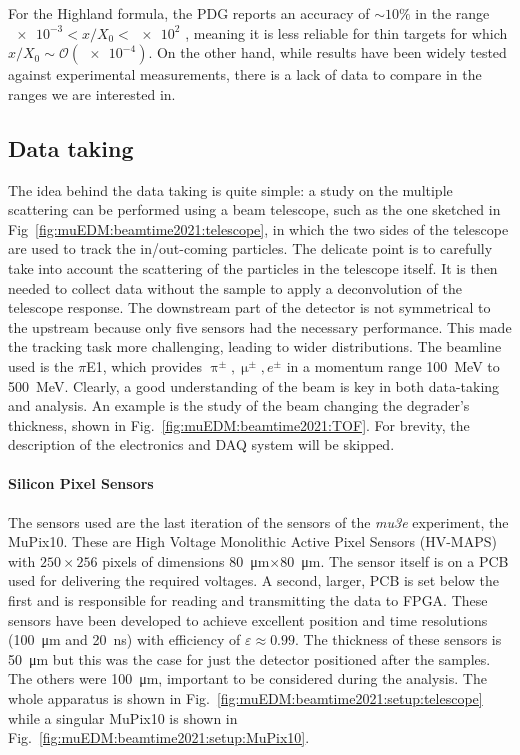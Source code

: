 \begin{refsection}
        \noindent
        For the Highland formula, the PDG reports an accuracy of $\sim 10\%$ in the range $\num{e-3}<x/X_0<\num{e2}$ \cite{PDG}, meaning it is less reliable for thin targets for which $x/X_0 \sim \mathcal{O}(\num{e-4})$.
        On the other hand, while \gf results have been widely tested against experimental measurements, there is a lack of data to compare in the ranges we are interested in.

    \subsection{Data taking}
        The idea behind the data taking is quite simple: a study on the multiple scattering can be performed using a beam telescope, such as the one sketched in Fig~\ref{fig:muEDM:beamtime2021:telescope}, in which the two sides of the telescope are used to track the in/out-coming particles. 
        The delicate point is to carefully take into account the scattering of the particles in the telescope itself. 
        It is then needed to collect data without the sample to apply a deconvolution of the telescope response.
        The downstream part of the detector is not symmetrical to the upstream because only five sensors had the necessary performance. This made the tracking task more challenging, leading to wider distributions.
        The beamline used is the $\pi$E1, which provides $\uppi^\pm,\upmu^\pm,e^\pm$ in a momentum range \SI{100}{MeV} to \SI{500}{MeV}.
        Clearly, a good understanding of the beam is key in both data-taking and analysis. 
        An example is the study of the beam changing the degrader's thickness, shown in Fig.~\ref{fig:muEDM:beamtime2021:TOF}.
        For brevity, the description of the electronics and DAQ system will be skipped. 

        \paragraph{Silicon Pixel Sensors}
        The sensors used are the last iteration of the sensors of the \textit{mu3e} experiment, the MuPix10. 
        These are High Voltage Monolithic Active Pixel Sensors (HV-MAPS) with $250\times256$ pixels of dimensions \SI{80}{\micro m}$\times$\SI{80}{\micro m}. 
        The sensor itself is on a PCB used for delivering the required voltages.
        A second, larger, PCB is set below the first and is responsible for reading and transmitting the data to FPGA.
        These sensors have been developed to achieve excellent position and time resolutions (\SI{100}{\micro m} and \SI{20}{ns}) with efficiency of $\varepsilon \approx 0.99$. 
        The thickness of these sensors is \SI{50}{\micro m} but this was the case for just the detector positioned after the samples. 
        The others were \SI{100}{\micro m}, important to be considered during the analysis.
        The whole apparatus is shown in Fig.~\ref{fig:muEDM:beamtime2021:setup:telescope} while a singular MuPix10 is shown in Fig.~\ref{fig:muEDM:beamtime2021:setup:MuPix10}.
        

\end{refsection}

